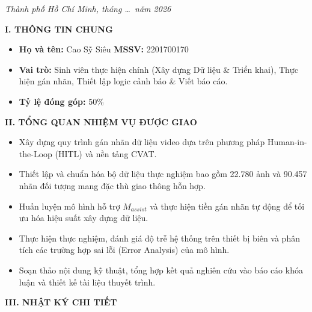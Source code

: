 \documentclass[12pt,a4paper]{report}
\begin{document}
	\vfill
	
	\begin{center}
		\textit{Thành phố Hồ Chí Minh, tháng \dots\ năm 2026}
	\end{center}
\newpage

\textbf{I. THÔNG TIN CHUNG}
\begin{itemize}
	\item \textbf{Họ và tên:} Cao Sỹ Siêu \hspace{1cm} \textbf{MSSV:} 2201700170
	\item \textbf{Vai trò:} Sinh viên thực hiện chính (Xây dựng Dữ liệu \& Triển khai), Thực hiện gán nhãn, Thiết lập logic cảnh báo \& Viết báo cáo.
	\item \textbf{Tỷ lệ đóng góp:} 50\%
\end{itemize}

\textbf{II. TỔNG QUAN NHIỆM VỤ ĐƯỢC GIAO}
\begin{itemize}
    \item Xây dựng quy trình gán nhãn dữ liệu video dựa trên phương pháp Human-in-the-Loop (HITL) và nền tảng CVAT.
    \item Thiết lập và chuẩn hóa bộ dữ liệu thực nghiệm bao gồm 22.780 ảnh và 90.457 nhãn đối tượng mang đặc thù giao thông hỗn hợp.
    \item Huấn luyện mô hình hỗ trợ $M_{assist}$ và thực hiện tiền gán nhãn tự động để tối ưu hóa hiệu suất xây dựng dữ liệu.
    \item Thực hiện thực nghiệm, đánh giá độ trễ hệ thống trên thiết bị biên và phân tích các trường hợp sai lỗi (Error Analysis) của mô hình.
    \item Soạn thảo nội dung kỹ thuật, tổng hợp kết quả nghiên cứu vào báo cáo khóa luận và thiết kế tài liệu thuyết trình.
\end{itemize}

\textbf{III. NHẬT KÝ CHI TIẾT}
\end{document}
